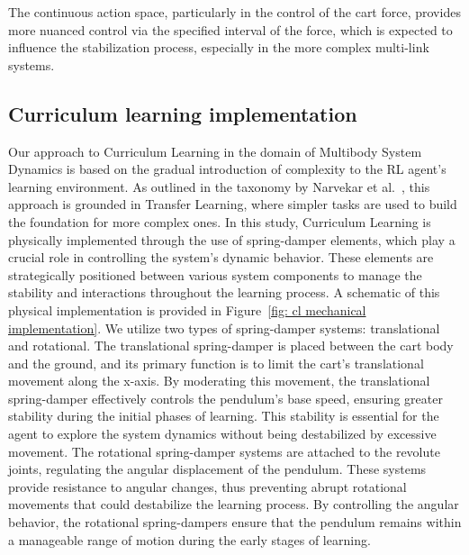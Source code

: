 The continuous action space, particularly in the control of the cart force, provides more nuanced control via the specified interval of the force, which is expected to influence the stabilization process, especially in the more complex multi-link systems.

\subsection{Curriculum learning implementation} \label{subsec: Curriculum learning implementation}
Our approach to Curriculum Learning in the domain of Multibody System Dynamics is based on the gradual introduction of complexity to the RL agent’s learning environment. As outlined in the taxonomy by Narvekar et al.~\cite{narvekar2020survey}, this approach is grounded in Transfer Learning, where simpler tasks are used to build the foundation for more complex ones.
In this study, Curriculum Learning is physically implemented through the use of spring-damper elements, which play a crucial role in controlling the system's dynamic behavior. These elements are strategically positioned between various system components to manage the stability and interactions throughout the learning process. A schematic of this physical implementation is provided in Figure~\ref{fig: cl mechanical implementation}. We utilize two types of spring-damper systems: translational and rotational.
The translational spring-damper is placed between the cart body and the ground, and its primary function is to limit the cart’s translational movement along the x-axis. By moderating this movement, the translational spring-damper effectively controls the pendulum’s base speed, ensuring greater stability during the initial phases of learning. This stability is essential for the agent to explore the system dynamics without being destabilized by excessive movement. The rotational spring-damper systems are attached to the revolute joints, regulating the angular displacement of the pendulum. These systems provide resistance to angular changes, thus preventing abrupt rotational movements that could destabilize the learning process. By controlling the angular behavior, the rotational spring-dampers ensure that the pendulum remains within a manageable range of motion during the early stages of learning.

